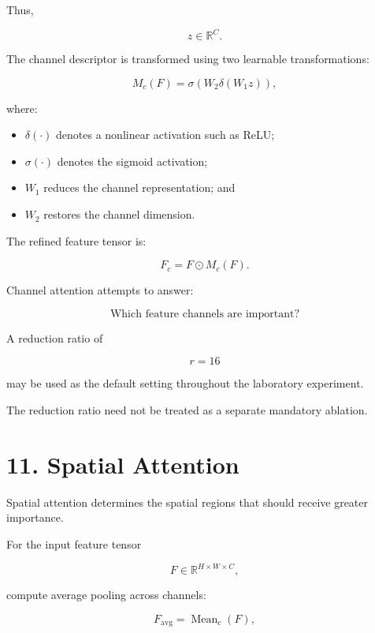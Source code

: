 \documentclass[10pt]{article}
\begin{document}
Thus,

\[
z\in\mathbb{R}^{C}.
\]

The channel descriptor is transformed using two learnable transformations:

\[
M_c(F)
=
\sigma
\left(
W_2
\delta
\left(
W_1z
\right)
\right),
\]

where:

\begin{itemize}

\item $\delta(\cdot)$ denotes a nonlinear activation such as ReLU;

\item $\sigma(\cdot)$ denotes the sigmoid activation;

\item $W_1$ reduces the channel representation; and

\item $W_2$ restores the channel dimension.

\end{itemize}

The refined feature tensor is:

\[
F_c
=
F\odot M_c(F).
\]

Channel attention attempts to answer:

\[
\boxed{\text{Which feature channels are important?}}
\]

A reduction ratio of

\[
r=16
\]

may be used as the default setting throughout the laboratory experiment.

The reduction ratio need not be treated as a separate mandatory ablation.

\section*{11. Spatial Attention}

Spatial attention determines the spatial regions that should receive greater
importance.

For the input feature tensor

\[
F\in\mathbb{R}^{H\times W\times C},
\]

compute average pooling across channels:

\[
F_{\mathrm{avg}}
=
\operatorname{Mean}_{c}(F),
\]
\end{document}
